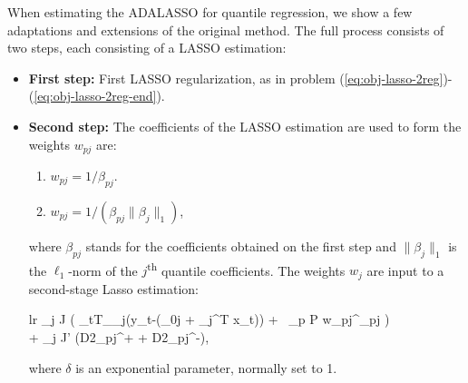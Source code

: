 When estimating the ADALASSO for quantile regression, we show a few adaptations and extensions of the original method. The full process consists of two steps, each consisting of a LASSO estimation:
\begin{itemize}
	\item \textbf{First step:} First LASSO regularization, as in problem (\ref{eq:obj-lasso-2reg})-(\ref{eq:obj-lasso-2reg-end}).
	
	\item \textbf{Second step:} The coefficients of the LASSO estimation are used to form the weights $w_{pj}$  are:
	\begin{enumerate}
		\item $w_{pj} = 1/ \beta_{pj}$.
		\item $w_{pj} = 1/ (\beta_{pj} \parallel \beta_j \parallel_1)$,
	\end{enumerate}
	where $\beta_{pj}$ stands for the coefficients obtained on the first step and $\parallel \beta_j \parallel_1$ is the $\ell_1$-norm of the $j$\textsuperscript{th} quantile coefficients.
	The weights $w_j$ are input to a second-stage Lasso estimation:
	\begin{IEEEeqnarray*}{lr}
		 \sum_{j \in J} \left( \sum_{t\in T}\rho_{\alpha_j}(y_{t}-(\beta_{0j} + \beta_j^T x_t)) + \lambda\  \sum_{p \in P} w_{pj}^\delta \mid  \beta_{pj} \mid \right) \span \\
		\span + \gamma \sum_{j \in J'} (D2_{pj}^+ + D2_{pj}^-),
	\end{IEEEeqnarray*}
	where $\delta$ is an exponential parameter, normally set to 1.
\end{itemize}

%
%
